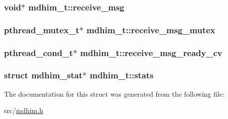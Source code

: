 \hypertarget{structmdhim__t_abc3233b7d61111d19bb7ac0222a918fc}{
\subsubsection[{receive\-\_\-msg}]{\setlength{\rightskip}{0pt plus 5cm}void$\ast$ mdhim\-\_\-t\-::receive\-\_\-msg}}\label{d8/dbc/structmdhim__t_abc3233b7d61111d19bb7ac0222a918fc}
\hypertarget{structmdhim__t_ae5abe6f33b5951a30f582fda42292706}{
\subsubsection[{receive\-\_\-msg\-\_\-mutex}]{\setlength{\rightskip}{0pt plus 5cm}pthread\-\_\-mutex\-\_\-t$\ast$ mdhim\-\_\-t\-::receive\-\_\-msg\-\_\-mutex}}\label{d8/dbc/structmdhim__t_ae5abe6f33b5951a30f582fda42292706}
\hypertarget{structmdhim__t_ac4a79eb13f34377840b924c41802f0fb}{
\subsubsection[{receive\-\_\-msg\-\_\-ready\-\_\-cv}]{\setlength{\rightskip}{0pt plus 5cm}pthread\-\_\-cond\-\_\-t$\ast$ mdhim\-\_\-t\-::receive\-\_\-msg\-\_\-ready\-\_\-cv}}\label{d8/dbc/structmdhim__t_ac4a79eb13f34377840b924c41802f0fb}
\hypertarget{structmdhim__t_a69e06bfc0fb536ac2759b3ebb4c8cca1}{
\subsubsection[{stats}]{\setlength{\rightskip}{0pt plus 5cm}struct {\bf mdhim\-\_\-stat}$\ast$ mdhim\-\_\-t\-::stats}}\label{d8/dbc/structmdhim__t_a69e06bfc0fb536ac2759b3ebb4c8cca1}


The documentation for this struct was generated from the following file\-:\begin{DoxyCompactItemize}
\item 
src/\hyperlink{mdhim_8h}{mdhim.\-h}\end{DoxyCompactItemize}
